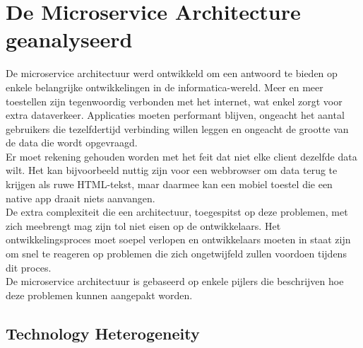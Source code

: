 \chapter{De Microservice Architecture geanalyseerd}
\label{ch:analyse}

De microservice architectuur werd ontwikkeld om een antwoord te bieden op enkele belangrijke ontwikkelingen in de informatica-wereld. Meer en meer toestellen zijn tegenwoordig verbonden met het internet, wat enkel zorgt voor extra dataverkeer. Applicaties moeten performant blijven, ongeacht het aantal gebruikers die tezelfdertijd verbinding willen leggen en ongeacht de grootte van de data die wordt opgevraagd.
\\
Er moet rekening gehouden worden met het feit dat niet elke client dezelfde data wilt. Het kan bijvoorbeeld nuttig zijn voor een webbrowser om data terug te krijgen als ruwe HTML-tekst, maar daarmee kan een mobiel toestel die een native app draait niets aanvangen.
\\
De extra complexiteit die een architectuur, toegespitst op deze problemen, met zich meebrengt mag zijn tol niet eisen op de ontwikkelaars. Het ontwikkelingsproces moet soepel verlopen en ontwikkelaars moeten in staat zijn om snel te reageren op problemen die zich ongetwijfeld zullen voordoen tijdens dit proces.
\\
De microservice architectuur is gebaseerd op enkele pijlers die beschrijven hoe deze problemen kunnen aangepakt worden.

\section{Technology Heterogeneity}
\label{sec:technology-heterogeneity}

